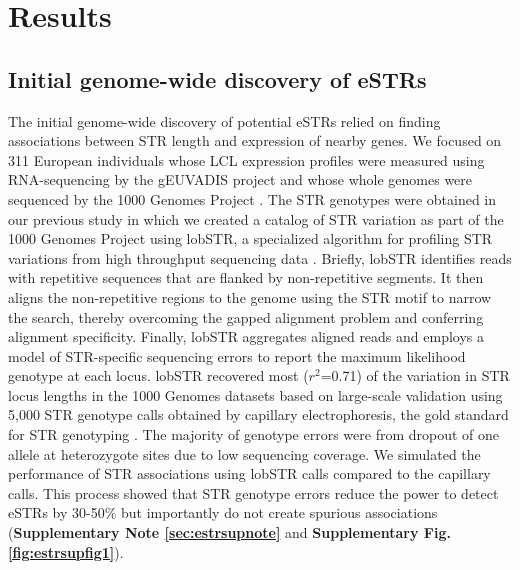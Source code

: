 \section{Results}
\subsection{Initial genome-wide discovery of eSTRs}
The initial genome-wide discovery of potential eSTRs relied on finding associations between STR length and expression of nearby genes. We focused on 311 European individuals whose LCL expression profiles were measured using RNA-sequencing by the gEUVADIS \cite{LappalainenSammethFriedlanderEtAl2013} project and whose whole genomes were sequenced by the 1000 Genomes Project \cite{AbecasisAltshulerAutonEtAl2010}. The STR genotypes were obtained in our previous study \cite{WillemsGymrekHighnamEtAl2014} in which we created a catalog of STR variation as part of the 1000 Genomes Project using lobSTR, a specialized algorithm for profiling STR variations from high throughput sequencing data \cite{GymrekGolanRossetEtAl2012}. Briefly, lobSTR identifies reads with repetitive sequences that are flanked by non-repetitive segments. It then aligns the non-repetitive regions to the genome using the STR motif to narrow the search, thereby overcoming the gapped alignment problem and conferring alignment specificity. Finally, lobSTR aggregates aligned reads and employs a model of STR-specific sequencing errors to report the maximum likelihood genotype at each locus. lobSTR recovered most ($r^2$=0.71) of the variation in STR locus lengths in the 1000 Genomes datasets based on large-scale validation using 5,000 STR genotype calls obtained by capillary electrophoresis, the gold standard for STR genotyping \cite{WillemsGymrekHighnamEtAl2014}. The majority of genotype errors were from dropout of one allele at heterozygote sites due to low sequencing coverage. We simulated the performance of STR associations using lobSTR calls compared to the capillary calls. This process showed that STR genotype errors reduce the power to detect eSTRs by 30-50\% but importantly do not create spurious associations (\textbf{Supplementary Note \ref{sec:estrsupnote}} and \textbf{Supplementary Fig. \ref{fig:estrsupfig1}}).

